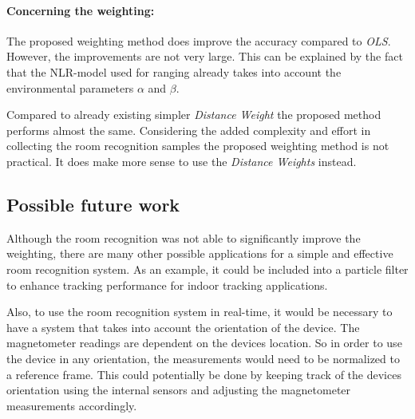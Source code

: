 \paragraph{Concerning the weighting:}

The proposed weighting method does improve the accuracy compared to \emph{OLS}. However, the improvements are not very large. This can be explained by the fact that the NLR-model used for ranging already takes into account the environmental parameters $\alpha$ and $\beta$.

Compared to already existing simpler \emph{Distance Weight} the proposed method performs almost the same. Considering the added complexity and effort in collecting the room recognition samples the proposed weighting method is not practical. It does make more sense to use the \emph{Distance Weights} instead.



\subsection{Possible future work}

Although the room recognition was not able to significantly improve the weighting, there are many other possible applications for a simple and effective room recognition system. As an example, it could be included into a particle filter to enhance tracking performance for indoor tracking applications.

Also, to use the room recognition system in real-time, it would be necessary to have a system that takes into account the orientation of the device. The magnetometer readings are dependent on the devices location. So in order to use the device in any orientation, the measurements would need to be normalized to a reference frame. This could potentially be done by keeping track of the devices orientation using the internal sensors and adjusting the magnetometer measurements accordingly.
